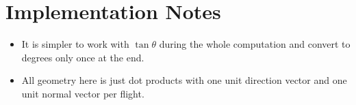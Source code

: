 \documentclass[11pt]{article}
\begin{document}
\section*{Implementation Notes}

\begin{itemize}[leftmargin=*]
    \item It is simpler to work with $\tan\theta$ during the whole computation and convert to degrees only
    once at the end.
    \item All geometry here is just dot products with one unit direction vector and one unit normal vector
    per flight.
\end{itemize}
\end{document}
